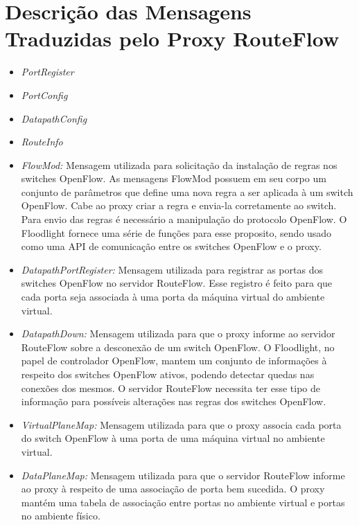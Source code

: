 \section{Descrição das Mensagens Traduzidas pelo Proxy RouteFlow}

\begin{itemize}
\item \textit{PortRegister}
\item \textit{PortConfig}
\item \textit{DatapathConfig}
\item \textit{RouteInfo}
\item \textit{FlowMod:} Mensagem utilizada para 
solicitação da instalação de regras nos switches 
OpenFlow. As mensagens FlowMod possuem em seu 
corpo um conjunto de parâmetros que define uma nova regra 
a ser aplicada à um switch OpenFlow. Cabe ao proxy 
criar a regra e envia-la corretamente ao switch. 
Para envio das regras é necessário a manipulação do 
protocolo OpenFlow. O Floodlight fornece uma série de 
funções para esse proposito, sendo usado como uma 
API de comunicação entre os switches OpenFlow e o 
proxy.
\item \textit{DatapathPortRegister:} Mensagem utilizada 
para registrar as portas dos switches OpenFlow 
no servidor RouteFlow. Esse registro é feito para que cada 
porta seja associada à uma porta da máquina 
virtual do ambiente virtual.
\item \textit{DatapathDown:} Mensagem utilizada para que 
o proxy informe ao servidor RouteFlow sobre a 
desconexão de um switch OpenFlow. O Floodlight, no papel 
de controlador OpenFlow, mantem um conjunto de 
informações à respeito dos switches OpenFlow ativos, 
podendo detectar quedas nas conexões dos mesmos. O 
servidor RouteFlow necessita ter esse tipo de informação para 
possíveis alterações nas regras dos 
switches OpenFlow.
\item \textit{VirtualPlaneMap:} Mensagem utilizada para que 
o proxy associa cada porta do switch 
OpenFlow à uma porta de uma máquina virtual no ambiente 
virtual.
\item \textit{DataPlaneMap:} Mensagem utilizada para que o 
servidor RouteFlow informe ao proxy à 
respeito de uma associação de porta bem sucedida. O proxy 
mantém uma tabela de associação entre portas 
no ambiente virtual e portas no ambiente físico.
\end{itemize}

